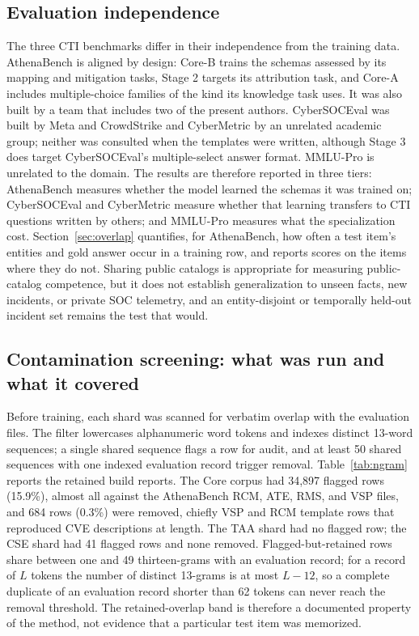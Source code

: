 \documentclass[twocolumn]{svjour3}
\begin{document}
\subsection{Evaluation independence}\label{sec:independence}
The three CTI benchmarks differ in their independence from the training data. AthenaBench is aligned by design: Core-B trains the schemas assessed by its mapping and mitigation tasks, Stage 2 targets its attribution task, and Core-A includes multiple-choice families of the kind its knowledge task uses. It was also built by a team that includes two of the present authors. CyberSOCEval was built by Meta and CrowdStrike and CyberMetric by an unrelated academic group; neither was consulted when the templates were written, although Stage 3 does target CyberSOCEval's multiple-select answer format. MMLU-Pro is unrelated to the domain. The results are therefore reported in three tiers: AthenaBench measures whether the model learned the schemas it was trained on; CyberSOCEval and CyberMetric measure whether that learning transfers to CTI questions written by others; and MMLU-Pro measures what the specialization cost. Section~\ref{sec:overlap} quantifies, for AthenaBench, how often a test item's entities and gold answer occur in a training row, and reports scores on the items where they do not. Sharing public catalogs is appropriate for measuring public-catalog competence, but it does not establish generalization to unseen facts, new incidents, or private SOC telemetry, and an entity-disjoint or temporally held-out incident set remains the test that would.

\subsection{Contamination screening: what was run and what it covered}\label{sec:contamination}
Before training, each shard was scanned for verbatim overlap with the evaluation files. The filter lowercases alphanumeric word tokens and indexes distinct 13-word sequences; a single shared sequence flags a row for audit, and at least 50 shared sequences with one indexed evaluation record trigger removal. Table~\ref{tab:ngram} reports the retained build reports. The Core corpus had 34,897 flagged rows (15.9\%), almost all against the AthenaBench RCM, ATE, RMS, and VSP files, and 684 rows (0.3\%) were removed, chiefly VSP and RCM template rows that reproduced CVE descriptions at length. The TAA shard had no flagged row; the CSE shard had 41 flagged rows and none removed. Flagged-but-retained rows share between one and 49 thirteen-grams with an evaluation record; for a record of $L$ tokens the number of distinct 13-grams is at most $L-12$, so a complete duplicate of an evaluation record shorter than 62 tokens can never reach the removal threshold. The retained-overlap band is therefore a documented property of the method, not evidence that a particular test item was memorized.
\end{document}
